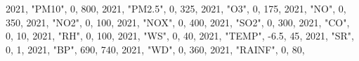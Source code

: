 \documentclass[
  letterpaper,
  DIV=11,
  numbers=noendperiod]{scrartcl}
\newenvironment{Shaded}{\begin{snugshade}}{\end{snugshade}}
\newcommand{\DecValTok}[1]{\textcolor[rgb]{0.68,0.00,0.00}{#1}}
\newcommand{\FloatTok}[1]{\textcolor[rgb]{0.68,0.00,0.00}{#1}}
\newcommand{\NormalTok}[1]{\textcolor[rgb]{0.00,0.23,0.31}{#1}}
\newcommand{\SpecialCharTok}[1]{\textcolor[rgb]{0.37,0.37,0.37}{#1}}
\newcommand{\StringTok}[1]{\textcolor[rgb]{0.13,0.47,0.30}{#1}}
\begin{document}
\begin{Shaded}
\begin{Highlighting}[]
  \DecValTok{2021}\NormalTok{, }\StringTok{"PM10"}\NormalTok{, }\DecValTok{0}\NormalTok{, }\DecValTok{800}\NormalTok{,}
  \DecValTok{2021}\NormalTok{, }\StringTok{"PM2.5"}\NormalTok{, }\DecValTok{0}\NormalTok{, }\DecValTok{325}\NormalTok{,}
  \DecValTok{2021}\NormalTok{, }\StringTok{"O3"}\NormalTok{, }\DecValTok{0}\NormalTok{, }\DecValTok{175}\NormalTok{,}
  \DecValTok{2021}\NormalTok{, }\StringTok{"NO"}\NormalTok{, }\DecValTok{0}\NormalTok{, }\DecValTok{350}\NormalTok{,}
  \DecValTok{2021}\NormalTok{, }\StringTok{"NO2"}\NormalTok{, }\DecValTok{0}\NormalTok{, }\DecValTok{100}\NormalTok{,}
  \DecValTok{2021}\NormalTok{, }\StringTok{"NOX"}\NormalTok{, }\DecValTok{0}\NormalTok{, }\DecValTok{400}\NormalTok{,}
  \DecValTok{2021}\NormalTok{, }\StringTok{"SO2"}\NormalTok{, }\DecValTok{0}\NormalTok{, }\DecValTok{300}\NormalTok{,}
  \DecValTok{2021}\NormalTok{, }\StringTok{"CO"}\NormalTok{, }\DecValTok{0}\NormalTok{, }\DecValTok{10}\NormalTok{,}
  \DecValTok{2021}\NormalTok{, }\StringTok{"RH"}\NormalTok{, }\DecValTok{0}\NormalTok{, }\DecValTok{100}\NormalTok{,}
  \DecValTok{2021}\NormalTok{, }\StringTok{"WS"}\NormalTok{, }\DecValTok{0}\NormalTok{, }\DecValTok{40}\NormalTok{,}
  \DecValTok{2021}\NormalTok{, }\StringTok{"TEMP"}\NormalTok{, }\SpecialCharTok{{-}}\FloatTok{6.5}\NormalTok{, }\DecValTok{45}\NormalTok{,}
  \DecValTok{2021}\NormalTok{, }\StringTok{"SR"}\NormalTok{, }\DecValTok{0}\NormalTok{, }\DecValTok{1}\NormalTok{,}
  \DecValTok{2021}\NormalTok{, }\StringTok{"BP"}\NormalTok{, }\DecValTok{690}\NormalTok{, }\DecValTok{740}\NormalTok{,}
  \DecValTok{2021}\NormalTok{, }\StringTok{"WD"}\NormalTok{, }\DecValTok{0}\NormalTok{, }\DecValTok{360}\NormalTok{,}
  \DecValTok{2021}\NormalTok{, }\StringTok{"RAINF"}\NormalTok{, }\DecValTok{0}\NormalTok{, }\DecValTok{80}\NormalTok{,}


\end{Highlighting}
\end{Shaded}
\end{document}
